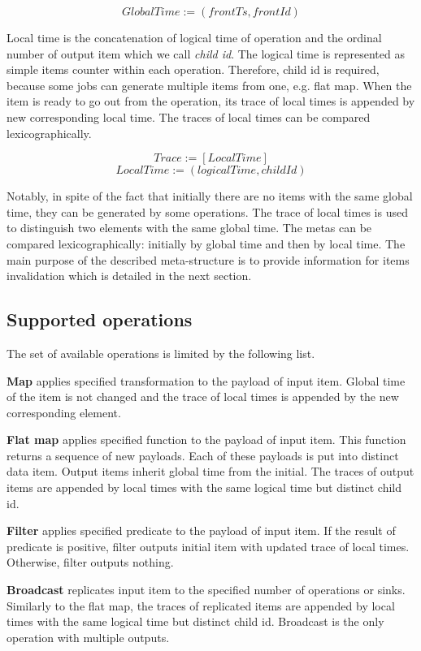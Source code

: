 \[GlobalTime := (frontTs, frontId)\]

Local time is the concatenation of logical time of operation and the ordinal number of output item which we call {\it child id}. The logical time is represented as simple items counter within each operation. Therefore, child id is required, because some jobs can generate multiple items from one, e.g. flat map. When the item is ready to go out from the operation, its trace of local times is appended by new corresponding local time. The traces of local times can be compared lexicographically.

\[Trace := [LocalTime]\]
\[LocalTime := (logicalTime, childId)\]

Notably, in spite of the fact that initially there are no items with the same global time, they can be generated by some operations. The trace of local times is used to distinguish two elements with the same global time. The metas can be compared lexicographically: initially by global time and then by local time. The main purpose of the described meta-structure is to provide information for items invalidation which is detailed in the next section.

\subsection{Supported operations}
The set of available operations is limited by the following list.

{\bf Map} applies specified transformation to the payload of input item. Global time of the item is not changed and the trace of local times is appended by the new corresponding element.

{\bf Flat map} applies specified function to the payload of input item. This function returns a sequence of new payloads. Each of these payloads is put into distinct data item. Output items inherit global time from the initial. The traces of output items are appended by local times with the same logical time but distinct child id.

{\bf Filter} applies specified predicate to the payload of input item. If the result of predicate is positive, filter outputs initial item with updated trace of local times. Otherwise, filter outputs nothing.

{\bf Broadcast} replicates input item to the specified number of operations or sinks. Similarly to the flat map, the traces of replicated items are appended by local times with the same logical time but distinct child id. Broadcast is the only operation with multiple outputs.

